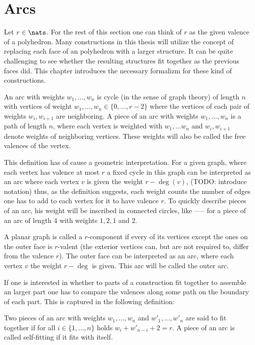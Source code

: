 \section{Arcs}

Let $r \in \nats$. For the rest of this section one can think of $r$ as the given valence of a polyhedron. Many constructions in this thesis will utilize the concept of replacing each face of an polyhedron with a larger structure. It can be quite challenging to see whether the resulting structures fit together as the previous faces did. This chapter introduces the necessary formalizm for these kind of constructions.

\begin{definition}[Arc]
  An arc with weights $w_1, \dots, w_n$ is cycle (in the sense of graph theory) of length $n$ with vertices of weight $w_1, \dots, w_n \in \{0, \dots, r - 2\}$ where the vertices of each pair of weights $w_i, w_{i+1}$ are neighboring. A piece of an arc with weights $w_1, \dots, w_n$ is a path of length $n$, where each vertex is weighted with $w_1, \dots w_n$ and $w_i, w_{i+1}$ denote weights of neighboring vertices. These weights will also be called the free valences of the vertex. 
\end{definition}

This definition has of cause a geometric interpretation. For a given graph, where each vertex has valence at most $r$ a fixed cycle in this graph can be interpreted as an arc where each vertex $v$ is given the weight $r - \deg(v)$, (TODO: introduce notation) thus, as the definition suggests, each weight counts the number of edges one has to add to each vertex for it to have valence $r$. To quickly describe pieces of an arc, his weight will be inscribed in connected circles, like  ------ for a piece of an arc of length $4$ with weights $1, 2, 1$ and $2$.
\begin{definition}
  A planar graph is called a $r$-component if every of its vertices except the ones on the outer face is $r$-valent (the exterior vertices can, but are not required to, differ from the valence $r$). The outer face can be interpreted as an arc, where each vertex $v$ the weight $r - \deg$ is given. This arc will be called the outer arc.
\end{definition}

If one is interested in whether to parts of a construction fit together to assemble an larger part one has to compare the valences along some path on the boundary of each part. This is captured in the following definition:
\begin{definition}
  Two pieces of an arc with weights $w_1, \dots, w_{n}$ and $w'_1, \dots, w'_{n}$ are said to fit together if for all $i \in \{1, \dots, n \}$ holds $w_i + w'_{n-i} + 2 = r$. A piece of an arc is called self-fitting if it fits with itself.
\end{definition}

